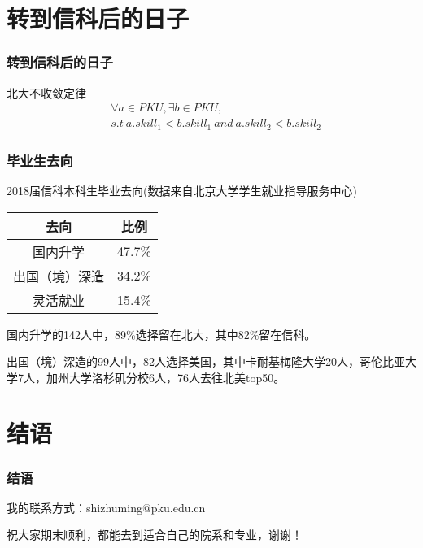 \documentclass[12pt,AutoFakeBold]{beamer}
\begin{document}
    \section{转到信科后的日子}
    \begin{frame}
        \frametitle{转到信科后的日子}
        \begin{block}{北大不收敛定律}
            \begin{equation*}
                \begin{split}
                    &\forall a \in PKU, \exists b \in PKU,\\
                    &s.t \ a.skill_1 < b.skill_1 \ and \ a.skill_2 < b.skill_2
                \end{split}
            \end{equation*}
        \end{block}
    \end{frame}
    \begin{frame}
        \frametitle{毕业生去向}
        2018届信科本科生毕业去向(数据来自北京大学学生就业指导服务中心)
        
        \begin{center}
            \begin{tabular}{cc}
                \toprule
                去向&比例\\
                \midrule
                国内升学&47.7\%\\
                出国（境）深造&34.2\%\\
                灵活就业&15.4\%\\
                \bottomrule
            \end{tabular}
        \end{center}

        国内升学的142人中，89\%选择留在北大，其中82\%留在信科。
        
        出国（境）深造的99人中，82人选择美国，其中卡耐基梅隆大学20人，哥伦比亚大学7人，加州大学洛杉矶分校6人，76人去往北美top50。

    \end{frame}
    \section{结语}
    \begin{frame}
        \frametitle{结语}
        我的联系方式：shizhuming@pku.edu.cn

        祝大家期末顺利，都能去到适合自己的院系和专业，谢谢！
    \end{frame}
\end{document}
